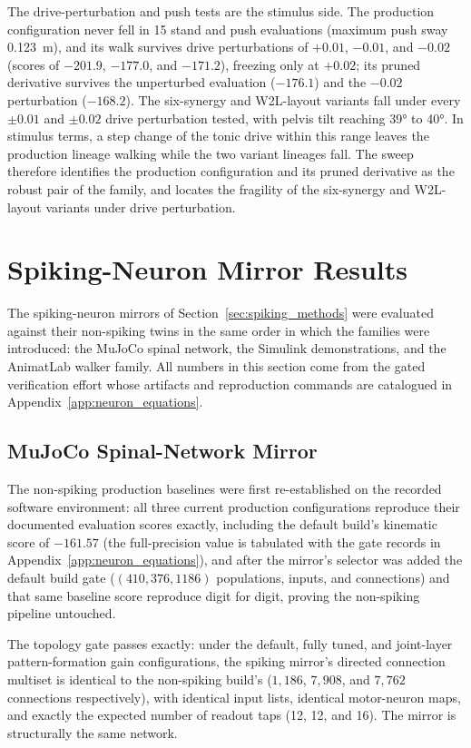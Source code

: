 The drive-perturbation and push tests are the stimulus side. The production configuration never fell in 15 stand and push evaluations (maximum push sway \qty{0.123}{\meter}), and its walk survives drive perturbations of $+0.01$, $-0.01$, and $-0.02$ (scores of $-201.9$, $-177.0$, and $-171.2$), freezing only at $+0.02$; its pruned derivative survives the unperturbed evaluation ($-176.1$) and the $-0.02$ perturbation ($-168.2$). The six-synergy and W2L-layout variants fall under every $\pm 0.01$ and $\pm 0.02$ drive perturbation tested, with pelvis tilt reaching \ang{39} to \ang{40}. In stimulus terms, a step change of the tonic drive within this range leaves the production lineage walking while the two variant lineages fall. The sweep therefore identifies the production configuration and its pruned derivative as the robust pair of the family, and locates the fragility of the six-synergy and W2L-layout variants under drive perturbation.

\section{Spiking-Neuron Mirror Results}\label{sec:spiking_results}

The spiking-neuron mirrors of Section~\ref{sec:spiking_methods} were evaluated against their non-spiking twins in the same order in which the families were introduced: the MuJoCo spinal network, the Simulink demonstrations, and the AnimatLab walker family. All numbers in this section come from the gated verification effort whose artifacts and reproduction commands are catalogued in Appendix~\ref{app:neuron_equations}.

\subsection{MuJoCo Spinal-Network Mirror}

The non-spiking production baselines were first re-established on the recorded software environment: all three current production configurations reproduce their documented evaluation scores exactly, including the default build's kinematic score of $-161.57$ (the full-precision value is tabulated with the gate records in Appendix~\ref{app:neuron_equations}), and after the mirror's selector was added the default build gate ($(410, 376, 1186)$ populations, inputs, and connections) and that same baseline score reproduce digit for digit, proving the non-spiking pipeline untouched.

The topology gate passes exactly: under the default, fully tuned, and joint-layer pattern-formation gain configurations, the spiking mirror's directed connection multiset is identical to the non-spiking build's ($1{,}186$, $7{,}908$, and $7{,}762$ connections respectively), with identical input lists, identical motor-neuron maps, and exactly the expected number of readout taps (12, 12, and 16). The mirror is structurally the same network.

